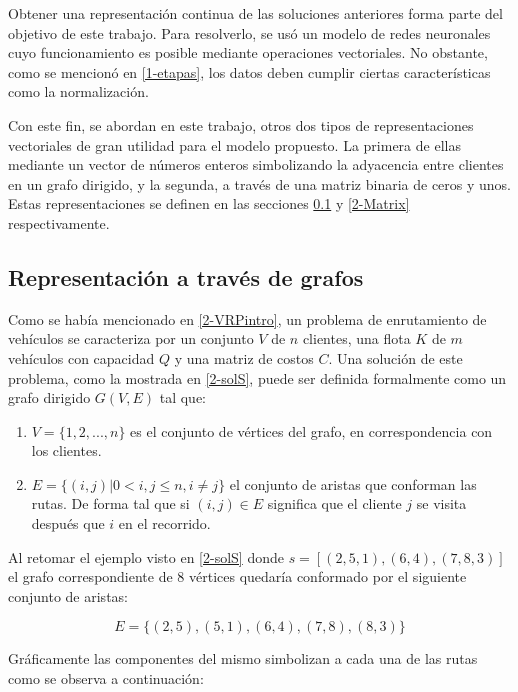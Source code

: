 Obtener una representación continua de las soluciones anteriores forma parte del objetivo de este trabajo. Para resolverlo, se usó un modelo de redes neuronales cuyo funcionamiento es posible mediante operaciones vectoriales. No obstante, como se mencionó en \ref{1-etapas}, los datos deben cumplir ciertas características como la normalización. 

Con este fin, se abordan en este trabajo, otros dos tipos de representaciones vectoriales de gran utilidad para el modelo propuesto. La primera de ellas mediante un vector de números enteros simbolizando la adyacencia entre clientes en un grafo dirigido, y la segunda, a través de una matriz binaria de ceros y unos. Estas representaciones se definen en las secciones \ref{2-Graph} y \ref{2-Matrix} respectivamente. 

\subsection{Representación a través de grafos}\label{2-Graph}

Como se había mencionado en \ref{2-VRPintro}, un problema de enrutamiento de vehículos se caracteriza por un conjunto $V$ de $n$ clientes, una flota $K$ de $m$ vehículos con capacidad $Q$ y una matriz de costos $C$. Una solución de este problema, como la mostrada en \ref{2-solS}, puede ser definida formalmente como un grafo dirigido $G(V,E)$ tal que:

\begin{enumerate}
	\item $V = \{1, 2, ..., n\}$ es el conjunto de vértices del grafo, en correspondencia con los clientes.
	
	\item $E = \{(i, j) | 0 < i, j \leq n, i \neq j \}$ el conjunto de aristas que conforman las rutas. De forma tal que si $(i, j) \in E$ significa que el cliente $j$  se visita después que $i$ en el recorrido.
\end{enumerate}    

Al retomar el ejemplo visto en \ref{2-solS} donde $s = [(2, 5, 1), (6, 4), (7, 8, 3)]$ el grafo correspondiente de 8 vértices quedaría conformado por el siguiente conjunto de aristas: 

\begin{equation}
\label{2-Es8}
	E = \{(2, 5), (5, 1), (6, 4), (7, 8), (8, 3)\}
\end{equation}

Gráficamente las componentes del mismo simbolizan a cada una de las rutas como se observa a continuación:


